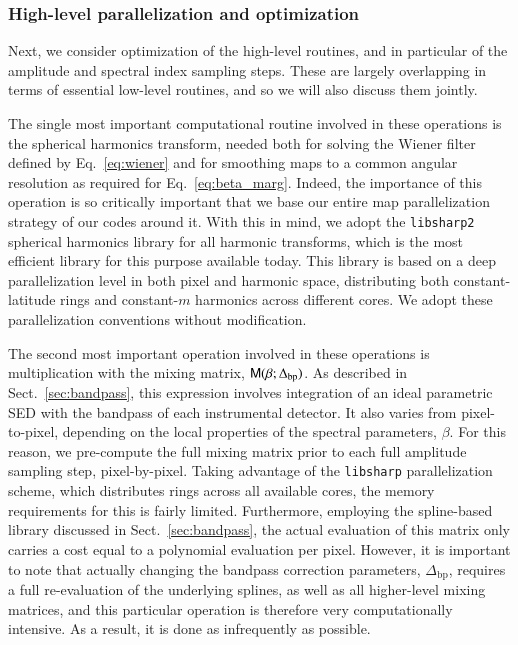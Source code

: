 \documentclass[twocolumn]{aa}
\newcommand{\M}[0]{\tens{M}}
\begin{document}
\subsubsection{High-level parallelization and optimization}

Next, we consider optimization of the high-level routines, and in
particular of the amplitude and spectral index sampling steps. These
are largely overlapping in terms of essential low-level routines, and
so we will also discuss them jointly.

The single most important computational routine involved in these
operations is the spherical harmonics transform, needed both for
solving the Wiener filter defined by Eq.~\eqref{eq:wiener} and for
smoothing maps to a common angular resolution as required for
Eq.~\eqref{eq:beta_marg}. Indeed, the importance of this operation is so
critically important that we base our entire map parallelization
strategy of our codes around it. With this in mind, we adopt the
\texttt{libsharp2} \citep{reinecke2013} spherical harmonics library
for all harmonic transforms, which is the most efficient library for
this purpose available today. This library is based on a deep
parallelization level in both pixel and harmonic space, distributing
both constant-latitude rings and constant-$m$ harmonics across
different cores. We adopt these parallelization conventions without
modification. 

The second most important operation involved in these operations is
multiplication with the mixing matrix, $\M(\beta;
\Delta_{\mathrm{bp}})$. As described in Sect.~\ref{sec:bandpass}, this
expression involves integration of an ideal parametric SED with the
bandpass of each instrumental detector. It also varies from
pixel-to-pixel, depending on the local properties of the spectral
parameters, $\beta$. For this reason, we pre-compute the full mixing
matrix prior to each full amplitude sampling step,
pixel-by-pixel. Taking advantage of the \texttt{libsharp} parallelization
scheme, which distributes rings across all available cores, the memory
requirements for this is fairly limited. Furthermore, employing the
spline-based library discussed in Sect.~\ref{sec:bandpass}, the actual
evaluation of this matrix only carries a cost equal to a polynomial
evaluation per pixel. However, it is important to note that actually
changing the bandpass correction parameters, $\Delta_{\mathrm{bp}}$, requires
a full re-evaluation of the underlying splines, as well as all
higher-level mixing matrices, and this particular operation is
therefore very computationally intensive. As a result, it is done as
infrequently as possible.
\end{document}
